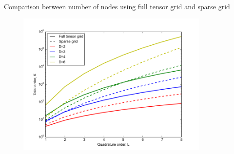 \documentclass{beamer}
\begin{document}
\begin{frame}{Comparison between number of nodes using full tensor grid and sparse grid}{}
     \begin{figure}
  \includegraphics[width=0.85\textwidth]{dimensionality_nodes_gq_sparse.png}
 \end{figure}
\end{frame}
 
 
\end{document}
